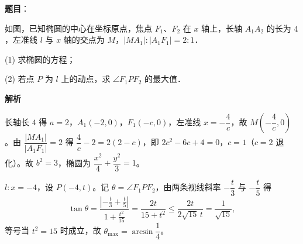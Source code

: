 \begin{answer}

\textbf{题目}：

如图，已知椭圆的中心在坐标原点，焦点 $F_1$、$F_2$ 在 $x$ 轴上，长轴 $A_1A_2$ 的长为 $4$，左准线 $l$ 与 $x$ 轴的交点为 $M$，$|MA_1| : |A_1F_1| = 2:1$．

(1) 求椭圆的方程；

(2) 若点 $P$ 为 $l$ 上的动点，求 $\angle F_1PF_2$ 的最大值．
\nopagebreak[4]
\begin{center}\end{center}
\nopagebreak[4]
\textbf{解析}


长轴长 $4$ 得 $a = 2$，$A_1(-2, 0)$，$F_1(-c, 0)$，左准线 $x = -\dfrac{4}{c}$，故 $M\left(-\dfrac{4}{c}, 0\right)$。由 $\dfrac{|MA_1|}{|A_1F_1|} = 2$ 得 $\dfrac{4}{c} - 2 = 2(2 - c)$，即 $2c^2 - 6c + 4 = 0$，$c = 1$（$c = 2$ 退化）。故 $b^2 = 3$，椭圆为 $\dfrac{x^2}{4} + \dfrac{y^2}{3} = 1$。


$l: x = -4$，设 $P(-4, t)$。记 $\theta = \angle F_1PF_2$，由两条视线斜率 $-\dfrac{t}{3}$ 与 $-\dfrac{t}{5}$ 得
\nopagebreak[4]
\[
\tan\theta = \frac{\left|-\frac{t}{3} + \frac{t}{5}\right|}{1 + \frac{t^2}{15}} = \frac{2t}{15 + t^2} \leqslant \frac{2t}{2\sqrt{15}\,t} = \frac{1}{\sqrt{15}},
\]
等号当 $t^2 = 15$ 时成立，故 $\theta_{\max} = \arcsin\dfrac{1}{4}$。



\end{answer}
